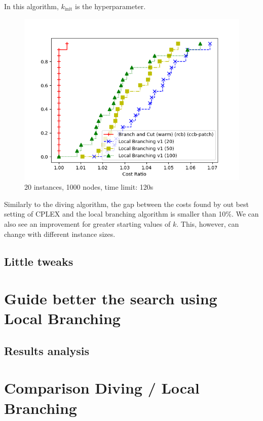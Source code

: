 In this algorithm, $k_{\text{init}}$ is the hyperparameter.

\begin{figure}[h]
    \centering
    \includegraphics*[width=.6\textwidth]{../plots/perfprof_lbv1_costs.png}
    \caption*{20 instances, 1000 nodes, time limit: 120s}
\end{figure}

Similarly to the diving algorithm, the gap between the costs found by out best setting of CPLEX and the local branching algorithm is smaller than 10\%. We can also see an improvement for greater starting values of $k$. This, however, can change with different instance sizes.


\subsection{Little tweaks}

\section{Guide better the search using Local Branching}

\subsection{Results analysis}

\section{Comparison Diving / Local Branching}